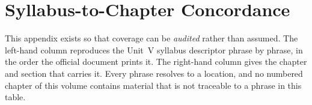 
\startappendices

\chapter{Syllabus-to-Chapter Concordance}

This appendix exists so that coverage can be \emph{audited} rather than assumed.
The left-hand column reproduces the Unit~V syllabus descriptor phrase by phrase,
in the order the official document prints it. The right-hand column gives the
chapter and section that carries it. Every phrase resolves to a location, and no
numbered chapter of this volume contains material that is not traceable to a
phrase in this table.

